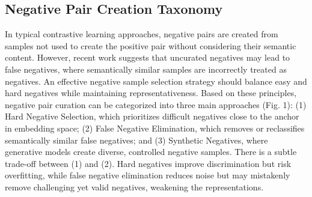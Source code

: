 \subsection{Negative Pair Creation Taxonomy}

In typical contrastive learning approaches, negative pairs are created from samples not used to create the positive pair without considering their semantic content. However, recent work \cite{huynh2022boosting} suggests that uncurated negatives may lead to false negatives, where semantically similar samples are incorrectly treated as negatives. An effective negative sample selection strategy should balance easy and hard negatives while maintaining representativeness. Based on these principles, negative pair curation can be categorized into three main approaches (Fig. 1): (1) Hard Negative Selection, which prioritizes difficult negatives close to the anchor in embedding space; (2) False Negative Elimination, which removes or reclassifies semantically similar false negatives; and (3) Synthetic Negatives, where generative models create diverse, controlled negative samples. There is a subtle trade-off between (1) and (2). Hard negatives improve discrimination but risk overfitting, while false negative elimination reduces noise but may mistakenly remove challenging yet valid negatives, weakening the representations.

